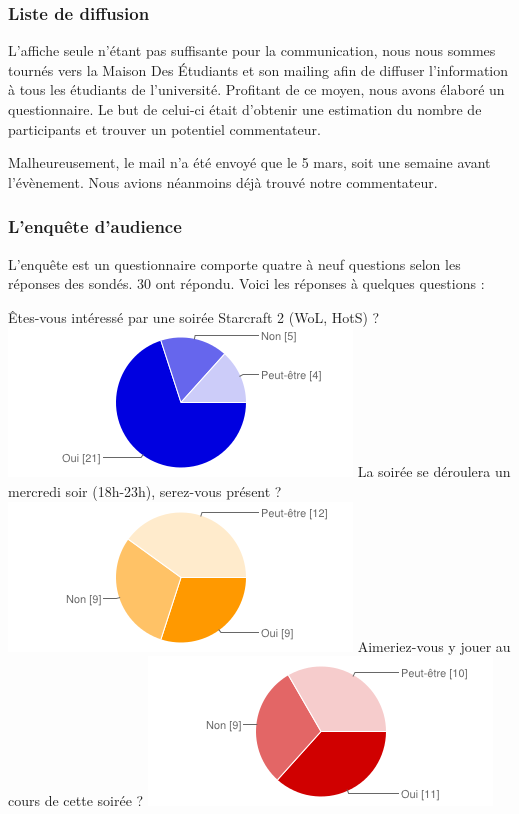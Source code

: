 \subsubsection{Liste de diffusion}%
\label{ssub:liste_de_diffusion}

L’affiche seule n’étant pas suffisante pour la communication, nous nous sommes tournés vers la
Maison Des Étudiants et son mailing afin de diffuser l’information à tous les étudiants de l’université.
Profitant de ce moyen, nous avons élaboré un questionnaire. Le but de celui-ci était d’obtenir une estimation
du nombre de participants et trouver un potentiel commentateur.

Malheureusement, le mail n’a été envoyé que le 5 mars, soit une semaine avant l’évènement.
Nous avions néanmoins déjà trouvé notre commentateur.

\subsubsection{L'enquête d'audience}%
\label{ssub:l_enquete_d_audience}

L'enquête est un questionnaire comporte quatre à neuf questions selon les réponses des sondés. 30 ont répondu.
Voici les réponses à quelques questions :


Êtes-vous intéressé par une soirée Starcraft 2 (WoL, HotS) ?
\includegraphics{images/chart_1.png}
La soirée se déroulera un mercredi soir (18h-23h), serez-vous présent ?
\includegraphics{images/chart_2.png}
Aimeriez-vous y jouer au cours de cette soirée ?
\includegraphics{images/chart_3.png}


